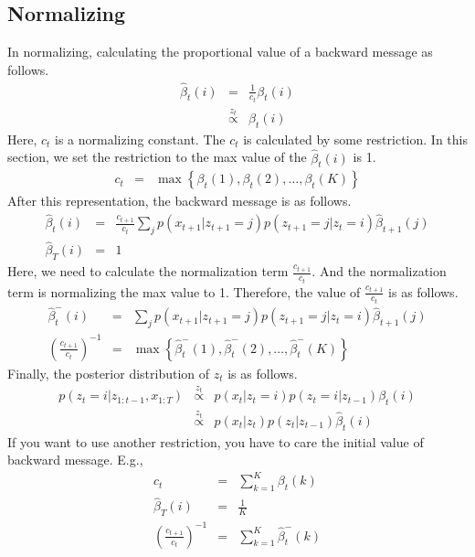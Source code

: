 \documentclass[a4paper]{article}
\newcommand{\proptoas}[1]{\overset{#1}{\propto}}
\begin{document}
	\subsection{Normalizing}
	In normalizing, calculating the proportional value of a backward message as follows.
	\begin{eqnarray}
		\hat{\beta}_t(i) &=& \frac{1}{c_t} \beta_t(i) \\
		&\proptoas{z_t}& \beta_t(i)
	\end{eqnarray}
	Here, $c_t$ is a normalizing constant.
	The $c_t$ is calculated by some restriction.
	In this section, we set the restriction to the max value of the $\hat{\beta}_t(i)$ is 1.
	\begin{eqnarray}
		c_t &=& \max{\left\{ \beta_t(1), \beta_t(2), \ldots, \beta_t(K)\right\}}
	\end{eqnarray}
	After this representation, the backward message is as follows.
	\begin{eqnarray}
		\hat{\beta}_t(i) &=& \frac{c_{t+1}}{c_t} \sum_{j}{p(x_{t+1} | z_{t+1} = j) p(z_{t+1} = j | z_{t} = i) \hat{\beta}_{t+1}(j)} \\
		\hat{\beta}_T(i) &=& 1
	\end{eqnarray}
	Here, we need to calculate the normalization term $\frac{c_{t+1}}{c_t}$.
	And the normalization term is normalizing the max value to 1.
	Therefore, the value of $\frac{c_{t+1}}{c_t}$ is as follows.
	\begin{eqnarray}
		\hat{\beta}_{t}^{-}(i)
		&=&
		\sum_{j}{p(x_{t+1} | z_{t+1} = j) p(z_{t+1} = j | z_{t} = i) \hat{\beta}_{t+1}(j)} \\
		\left(\frac{c_{t+1}}{c_t}\right)^{-1}
		&=&
		\max{\left\{ \hat{\beta}_{t}^{-}(1), \hat{\beta}_{t}^{-}(2), \ldots, \hat{\beta}_{t}^{-}(K)\right\}}
	\end{eqnarray}
	Finally, the posterior distribution of $z_t$ is as follows.
	\begin{eqnarray}
		p(z_{t} = i | z_{1:t-1}, x_{1:T})
		&\proptoas{z_t}&
		p(x_t | z_t = i) p(z_t = i | z_{t-1}) \beta_t(i) \\
		&\proptoas{z_t}&
		p(x_t | z_t) p(z_t | z_{t-1}) \hat{\beta}_t(i)
	\end{eqnarray}
	If you want to use another restriction, you have to care the initial value of backward message.
	E.g.,
	\begin{eqnarray}
		c_t &=& \sum_{k=1}^{K}{\beta_t(k)} \\
		\hat{\beta}_T(i) &=& \frac{1}{K}\\
		\left(\frac{c_{t+1}}{c_t}\right)^{-1} &=& \sum_{k=1}^{K}{\hat{\beta}_{t}^{-}(k)}
	\end{eqnarray}
\end{document}
